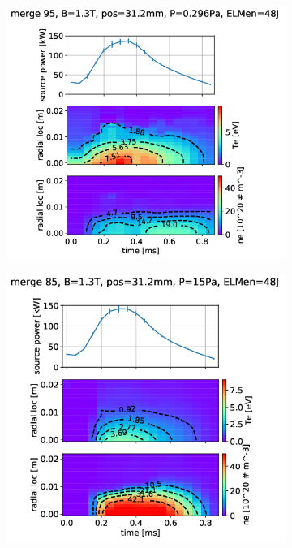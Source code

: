\begin{figure}[!ht]
     \centering
     \begin{subfigure}{0.34\textwidth}
         \centering
         \vspace*{-0mm}
         \includegraphics[width=\textwidth,trim={60 0 134 25},clip]{Chapters/chapter3/figs/pass_1_merge95_global_fit37.png}
         \vspace*{-55mm}
         {\color{white}\caption{\phantom{ }}\label{fig:TSb}}
     \end{subfigure}
     \hfill
     \begin{subfigure}{0.285\textwidth}
         \centering
         \vspace*{-0mm}
         \includegraphics[width=\textwidth,trim={100 0 120 25},clip]{Chapters/chapter3/figs/pass_1_merge85_global_fit45.png}

\end{subfigure}
\end{figure}
